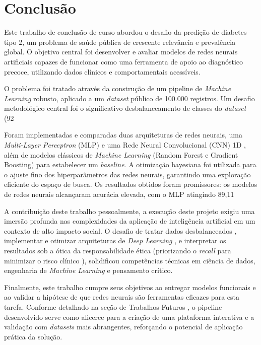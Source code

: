 
\chapter{Conclusão}
Este trabalho de conclusão de curso abordou o desafio da predição de diabetes tipo 2, um problema de saúde pública de crescente relevância e prevalência global. O objetivo central foi desenvolver e avaliar modelos de redes neurais artificiais capazes de funcionar como uma ferramenta de apoio ao diagnóstico precoce, utilizando dados clínicos e comportamentais acessíveis.

O problema foi tratado através da construção de um pipeline de \textit{Machine Learning} robusto, aplicado a um \textit{dataset} público de 100.000 registros. Um desafio metodológico central foi o significativo desbalanceamento de classes do \textit{dataset} (92%

Foram implementadas e comparadas duas arquiteturas de redes neurais, uma \textit{Multi-Layer Perceptron} (MLP) e uma Rede Neural Convolucional (CNN) 1D , além de modelos clássicos de \textit{Machine Learning} (Random Forest e Gradient Boosting) para estabelecer um \textit{baseline}. A otimização bayesiana foi utilizada para o ajuste fino dos hiperparâmetros das redes neurais, garantindo uma exploração eficiente do espaço de busca. Os resultados obtidos foram promissores: os modelos de redes neurais alcançaram acurácia elevada, com o MLP atingindo 89,11%

A contribuição deste trabalho pessoalmente, a execução deste projeto exigiu uma imersão profunda nas complexidades da aplicação de inteligência artificial em um contexto de alto impacto social. O desafio de tratar dados desbalanceados , implementar e otimizar arquiteturas de \textit{Deep Learning} , e interpretar os resultados sob a ótica da responsabilidade ética (priorizando o \textit{recall} para minimizar o risco clínico ), solidificou competências técnicas em ciência de dados, engenharia de \textit{Machine Learning} e pensamento crítico.

Finalmente, este trabalho cumpre seus objetivos ao entregar modelos funcionais e ao validar a hipótese de que redes neurais são ferramentas eficazes para esta tarefa. Conforme detalhado na seção de Trabalhos Futuros , o pipeline desenvolvido serve como alicerce para a criação de uma plataforma interativa e a validação com \textit{datasets} mais abrangentes, reforçando o potencial de aplicação prática da solução.